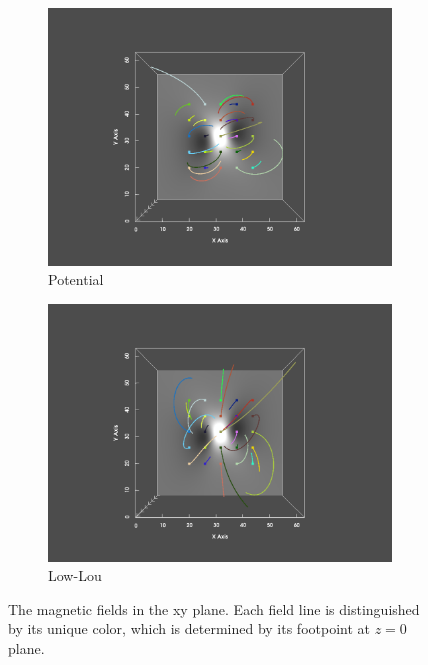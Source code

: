 \begin{figure}
  \begin{subfigure}{.5\linewidth}
    \centering
    \caption{Potential}
    \includegraphics[trim={6cm 1cm 6cm 2cm}, clip, width=\linewidth]{"img/LL_pot_xy.pdf"}
  \end{subfigure}%
  \begin{subfigure}{.5\linewidth}
    \centering
    \caption{Low-Lou}
    \includegraphics[trim={6cm 1cm 6cm 2cm}, clip, width=\linewidth]{"img/LL_xy.pdf"}
  \end{subfigure}
  
  \caption{The magnetic fields in the xy plane. Each field line is distinguished by its unique color, which is determined by its footpoint at $z=0$ plane.}\label{fig:xy}
\end{figure}

